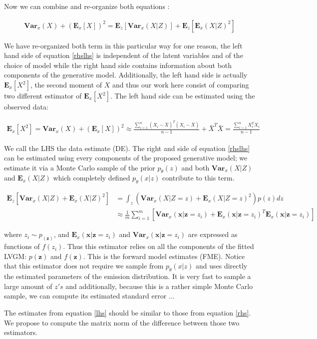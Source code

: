 \documentclass{article}
\newcommand{\Vx}{\textbf{Var}_x}
\newcommand{\Ex}{\textbf{E}_x}
\newcommand{\Ez}{\textbf{E}_z}
\newcommand{\x}{\mathbf{x}}
\newcommand{\z}{\mathbf{z}}
\begin{document}
Now we can combine and re-organize both equations :

\begin{align}
\Vx(X)+ (\Ex[X])^2 = \Ez[\Vx(X|Z)] + \Ez[\Ex(X|Z)^2]
\label{rhslhs}
\end{align}

We have re-organized both term in this particular way for one reason, the left hand side of equation \ref{rhslhs} is independent of the latent variables and of the choice of model while the right hand side contains information about both components of the generative model. Additionally, the left hand side is actually $\Ex[X^2]$, the second moment of $X$ and thus our work here consist of comparing two different estimator of $\Ex[X^2]$. The left hand side can be estimated using the observed data:  

\begin{align}
\Ex[X^2] = \Vx(X)+ (\Ex[X])^2 \approx \frac{\sum_{i=1}^n(X_i-\bar{X})^T(X_i-\bar{X})}{n-1} + \bar{X}^T\bar{X} = \frac{\sum_{i=1}^n X_i^TX_i}{n-1}
\label{lhs}
\end{align}

We call the LHS the data estimate (DE). The right and side of equation \ref{rhslhs} can be estimated using every components of the proposed generative model; we estimate it via a Monte Carlo sample of the prior $p_\theta(z)$ and both $\Vx(X|Z)$ and $\Ex(X|Z)$ which completely defined $p_\theta(x|z)$ contribute to this term. 

\begin{align}
\Ez[\Vx(X|Z) + \Ex(X|Z)^2] &= \int_z (\Vx(X|Z=z)+\Ex(X|Z=z)^2)p(z) dz \\ 
&\approx \frac{1}{m} \sum_{i=1}^m \left[\Vx(\x|\z=z_i) + \Ex(\x|\z=z_i)^T\Ex(\x|\z=z_i)\right]
\label{rhs}
\end{align}

where $z_i \sim p_(\z)$, and $\Ex(\x|\z=z_i)$ and  $\Vx(\x|\z=z_i)$ are expressed as functions of $f(z_i)$. Thus this estimator relies on all the components of the fitted LVGM: $p(\z)$ and $f(\z)$. This is the forward model estimates (FME). Notice that this estimator does not require we sample from $p_\theta(x|z)$ and uses directly the estimated parameters of the emission distribution. It is very fast to sample a large amount of $z's$ and additionally, because this is a rather simple Monte Carlo sample, we can compute its estimated standard error ...

\bigskip

The estimates from equation \ref{lhs} should be similar to those from equation \ref{rhs}. We propose to compute the matrix norm of the difference between those two estimators.
\end{document}
